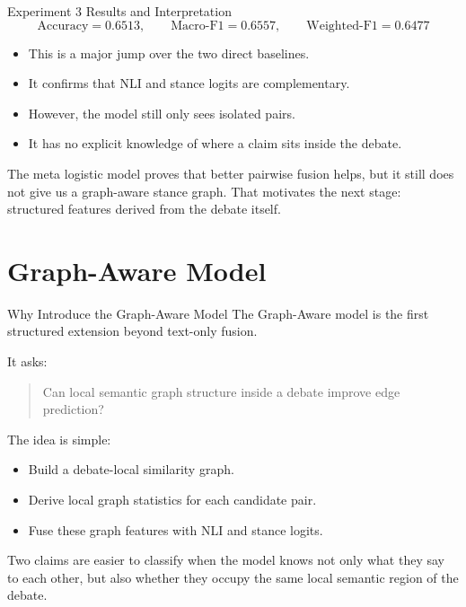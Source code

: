 \documentclass[aspectratio=169, 10pt]{beamer}
\newcommand{\researchbox}[2]{%
  \begin{tcolorbox}[colback=accentorange!10, colframe=accentorange,
    title={\textbf{Research Lens:} #1}, fonttitle=\bfseries\small,
    left=4pt, right=4pt, top=3pt, bottom=3pt, boxrule=1pt]
    \small #2
  \end{tcolorbox}}
\newcommand{\takeawaybox}[2]{%
  \begin{tcolorbox}[colback=accentgreen!10, colframe=accentgreen,
    title={\textbf{Takeaway:} #1}, fonttitle=\bfseries\small,
    left=4pt, right=4pt, top=3pt, bottom=3pt, boxrule=1pt]
    \small #2
  \end{tcolorbox}}
\begin{document}
\begin{frame}{Experiment 3 Results and Interpretation}
\[
\text{Accuracy}=0.6513,\qquad
\text{Macro-F1}=0.6557,\qquad
\text{Weighted-F1}=0.6477
\]

\begin{itemize}
  \item This is a major jump over the two direct baselines.
  \item It confirms that NLI and stance logits are complementary.
  \item However, the model still only sees isolated pairs.
  \item It has no explicit knowledge of where a claim sits inside the debate.
\end{itemize}

\takeawaybox{Transition}{
The meta logistic model proves that better pairwise fusion helps, but it still does not give us a graph-aware stance graph. That motivates the next stage: structured features derived from the debate itself.
}
\end{frame}

\section{Graph-Aware Model}

\begin{frame}{Why Introduce the Graph-Aware Model}
The Graph-Aware model is the first structured extension beyond text-only fusion.

It asks:
\begin{quote}
Can local semantic graph structure inside a debate improve edge prediction?
\end{quote}

The idea is simple:
\begin{itemize}
  \item Build a debate-local similarity graph.
  \item Derive local graph statistics for each candidate pair.
  \item Fuse these graph features with NLI and stance logits.
\end{itemize}

\researchbox{Core Hypothesis}{
Two claims are easier to classify when the model knows not only what they say to each other, but also whether they occupy the same local semantic region of the debate.
}
\end{frame}
\end{document}
